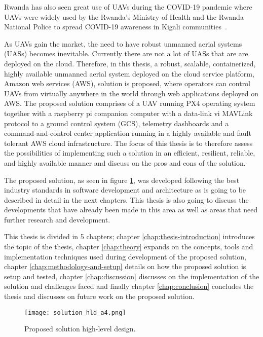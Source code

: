 Rwanda has also seen great use of UAVs during the COVID-19 pandemic where UAVs were widely used by the Rwanda’s Ministry of Health and the Rwanda National Police to spread COVID-19 awareness in Kigali communities~\cite{whoafricarw2020}.

As UAVs gain the market, the need to have robust unmanned aerial systems (UASs) becomes inevitable. Currently there are not a lot of UASs that are are deployed on the cloud. Therefore, in this thesis, a robust, scalable, containerized, highly available unmanned aerial system deployed on the cloud service platform, Amazon web services (AWS), solution is proposed, where operators can control UAVs from virtually anywhere in the world through web applications deployed on AWS. The proposed solution comprises of a UAV running PX4 operating system together with a raspberry pi companion computer with a data-link vi MAVLink protocol to a ground control system (GCS), telemetry dashboards and a command-and-control center application running in a highly available and fault tolerant AWS cloud infrastructure. The focus of this thesis is to therefore assess the possibilities of implementing such a solution in an efficient, resilient, reliable, and highly available manner and discuss on the pros and cons of the solution.

The proposed solution, as seen in figure \ref{fig:uas-hhld}, was developed following the best industry standards in software development and architecture as is going to be described in detail in the next chapters. This thesis is also going to discuss the developments that have already been made in this area as well as areas that need further research and development.

This thesis is divided in 5 chapters; chapter \ref{chap:thesis-introduction} introduces the topic of the thesis, chapter \ref{chap:theory} expands on the concepts, tools and implementation techniques used during development of the proposed solution, chapter \ref{chap:methodology-and-setup} details on how the proposed solution is setup and tested, chapter \ref{chap:discussion} discusses on the implementation of the solution and challenges faced and finally chapter \ref{chap:conclusion} concludes the thesis and discusses on future work on the proposed solution.

\begin{figure}[!htbp]
    \centering \texttt{[image: solution\_hld\_a4.png]}
    \caption{Proposed solution high-level design.}
    \label{fig:uas-hhld}
\end{figure}


